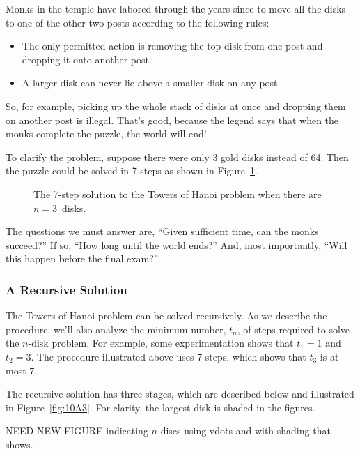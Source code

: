 Monks in the temple have labored through the years since to move all
the disks to one of the other two posts according to the following
rules:
\begin{itemize}
\item The only permitted action is removing the top disk from one post
and dropping it onto another post.
\item A larger disk can never lie above a smaller disk on any post.
\end{itemize}
So, for example, picking up the whole stack of disks at once
and dropping them on another post is illegal.  That's good, because
the legend says that when the monks complete the puzzle, the world
will end!

To clarify the problem, suppose there were only 3 gold disks instead
of 64.  Then the puzzle could be solved in 7 steps as shown in
Figure~\ref{fig:10A2}.

\begin{figure}


\caption{The 7-step solution to the Towers of Hanoi problem when there
are $n = 3$~disks.}

\label{fig:10A2}

\end{figure}

The questions we must answer are, ``Given sufficient time, can the
monks succeed?''  If so, ``How long until the world ends?''  And, most
importantly, ``Will this happen before the final exam?''

\subsubsection{A Recursive Solution}

The Towers of Hanoi problem can be solved recursively.  As we describe
the procedure, we'll also analyze the minimum number, $t_n$, of steps
required to solve the $n$-disk problem.  For example, some
experimentation shows that $t_1 = 1$ and $t_2 = 3$.  The procedure
illustrated above uses 7 steps, which shows that $t_3$ is at most 7.

The recursive solution has three stages, which are described below and
illustrated in Figure~\ref{fig:10A3}.
For clarity, the largest disk is shaded in the figures.

\begin{editingnotes}
NEED NEW FIGURE indicating $n$ discs using vdots and with shading that shows.
\end{editingnotes}

